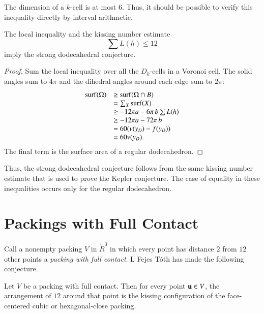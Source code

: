 \begin{note} %
The dimension of a $k$-cell is at most $6$.  Thus, it should be possible to verify this inequality directly by interval arithmetic.
\end{note}

\begin{lemma}  The local inequality and the kissing number estimate
$$
\sum L(h) \le 12
$$
imply the strong dodecahedral conjecture.
\end{lemma}

\begin{proof} 
Sum the local inequality over all the $D_k$-cells in a Voronoi cell.  The solid angles sum to $4\pi$ and the dihedral angles around each edge sum to $2\pi$:
$$
\begin{array}{lll}
{\operatorname{surf}}(\Omega) &\ge {\operatorname{surf}}(\Omega\cap B)\\
&=\sum_X {\operatorname{surf}}(X)\\
&\ge -12\pi a - 6\pi\, b  \sum L(h)\\
&\ge -12\pi a - 72\pi\, b\\
&= 60 (v(y_D) - f(y_D))\\
&= 60 v(y_D).\\
\end{array}
$$
The final term is the surface area of a regular dodecahedron.
\end{proof}

Thus, the strong dodecahedral conjecture follows from the same kissing number estimate that is used to prove the Kepler conjecture.  The case of equality in these inequalities occurs only for the regular dodecahedron.

\section{Packings with Full Contact}



Call a nonempty packing $ V$ in $\ring{R}^3$ in which every point has distance $2$ from  $12$ other points a {\it packing with full contact}. L Fejes T\'oth has made the following conjecture.
%
%
%

\begin{conjecture}  Let $ V$ be a packing with full contact.  Then for every point $ {\mathbf u}\in V$, the arrangement of $12$ around that point is the kissing configuration of the face-centered cubic or hexagonal-close packing. 
\end{conjecture}
%
%
%

